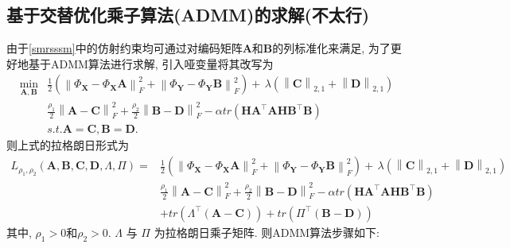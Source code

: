 \documentclass[lang=cn,10pt]{gorgeousnbook}
\numberwithin{equation}{section}%
\numberwithin{figure}{section}%
\begin{document}
\subsection{基于交替优化乘子算法(ADMM)的求解(不太行)}

由于\eqref{smrsssm}中的仿射约束均可通过对编码矩阵$\bm{A}$和$\bm{B}$的列标准化来满足, 为了更好地基于ADMM算法进行求解, 引入哑变量将其改写为
\begin{equation}
    \begin{aligned}
\min_{\boldsymbol{A},\boldsymbol{B}}&\frac{1}{2}\left( \left\| \varPhi _{\boldsymbol{X}}-\varPhi _{\boldsymbol{X}}\boldsymbol{A} \right\| _{F}^{2}+\left\| \varPhi _{\boldsymbol{Y}}-\varPhi _{\boldsymbol{Y}}\boldsymbol{B} \right\| _{F}^{2} \right) +\,\lambda \left( \left\| \boldsymbol{C} \right\| _{2,1}+\left\| \boldsymbol{D} \right\| _{2,1} \right)\\
& \frac{\rho _1}{2}\left\| \boldsymbol{A}-\boldsymbol{C} \right\| _{F}^{2}+\frac{\rho _2}{2}\left\| \boldsymbol{B}-\boldsymbol{D} \right\| _{F}^{2}-\alpha tr\left( \boldsymbol{HA}^{\top}\boldsymbol{AHB}^{\top}\boldsymbol{B} \right) \\
\,\,&s.t.  \boldsymbol{A}=\boldsymbol{C}, \boldsymbol{B}=\boldsymbol{D}.
\end{aligned}
\end{equation}
则上式的拉格朗日形式为
\begin{equation}
    \begin{aligned}
        L_{\rho _1,\rho _2}\left( \boldsymbol{A},\boldsymbol{B},\boldsymbol{C},\boldsymbol{D},\boldsymbol{\varLambda },\boldsymbol{\varPi } \right) =&\frac{1}{2}\left( \left\| \varPhi _{\boldsymbol{X}}-\varPhi _{\boldsymbol{X}}\boldsymbol{A} \right\| _{F}^{2}+\left\| \varPhi _{\boldsymbol{Y}}-\varPhi _{\boldsymbol{Y}}\boldsymbol{B} \right\| _{F}^{2} \right) +\,\lambda \left( \left\| \boldsymbol{C} \right\| _{2,1}+\left\| \boldsymbol{D} \right\| _{2,1} \right)\\
        & \frac{\rho _1}{2}\left\| \boldsymbol{A}-\boldsymbol{C} \right\| _{F}^{2}+\frac{\rho _2}{2}\left\| \boldsymbol{B}-\boldsymbol{D} \right\| _{F}^{2}-\alpha tr\left( \boldsymbol{HA}^{\top}\boldsymbol{AHB}^{\top}\boldsymbol{B} \right) \\
        & +tr\left( \boldsymbol{\varLambda }^{\top}\left( \boldsymbol{A}-\boldsymbol{C} \right) \right) +tr\left( \boldsymbol{\varPi }^{\top}\left( \boldsymbol{B}-\boldsymbol{D} \right) \right) 
    \end{aligned}
\end{equation}
其中, $\rho_1>0$和$\rho_2>0$. $\boldsymbol{\varLambda}$ 与 $\boldsymbol{\varPi }$ 为拉格朗日乘子矩阵. 则ADMM算法步骤如下:
\end{document}
